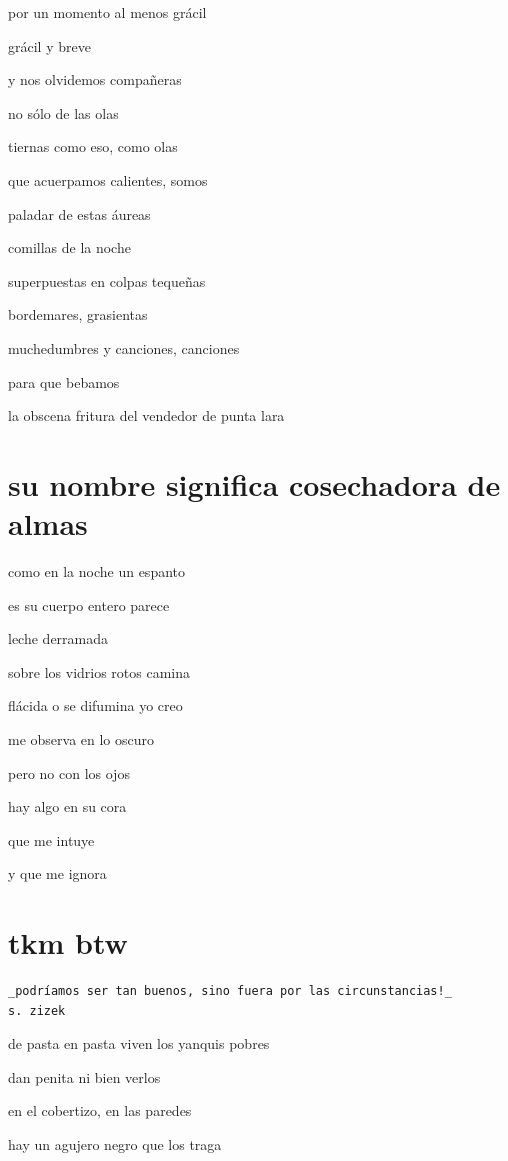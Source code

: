\documentclass[
]{book}
\begin{document}
por un momento al menos grácil

grácil y breve

y nos olvidemos compañeras

no sólo de las olas

tiernas como eso, como olas

que acuerpamos calientes, somos

paladar de estas áureas

comillas de la noche

superpuestas en colpas tequeñas

bordemares, grasientas

muchedumbres y canciones, canciones

para que bebamos

la obscena fritura del vendedor de punta lara

\hypertarget{su-nombre-significa-cosechadora-de-almas}{%
\chapter{su nombre significa cosechadora de almas}\label{su-nombre-significa-cosechadora-de-almas}}

como en la noche un espanto

es su cuerpo entero parece

leche derramada

sobre los vidrios rotos camina

flácida o se difumina yo creo

me observa en lo oscuro

pero no con los ojos

hay algo en su cora

que me intuye

y que me ignora

\hypertarget{tkm-btw}{%
\chapter{tkm btw}\label{tkm-btw}}

\begin{verbatim}
_podríamos ser tan buenos, sino fuera por las circunstancias!_
s. zizek
\end{verbatim}

de pasta en pasta viven los yanquis pobres

dan penita ni bien verlos

en el cobertizo, en las paredes

hay un agujero negro que los traga
\end{document}
